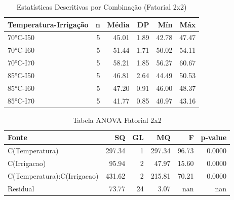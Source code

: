 \begin{table}[H]
\centering
\caption{Estatísticas Descritivas por Combinação (Fatorial 2x2)}
\label{tab:descritivas_fatorial}
\begin{tabular}{|l|r|r|r|r|r|}
\hline
\textbf{Temperatura-Irrigação} & \textbf{n} & \textbf{Média} & \textbf{DP} & \textbf{Mín} & \textbf{Máx} \\
\hline
70°C-I50 & 5 & 45.01 & 1.89 & 42.78 & 47.47 \\
70°C-I60 & 5 & 51.44 & 1.71 & 50.02 & 54.11 \\
70°C-I70 & 5 & 58.21 & 1.85 & 56.27 & 60.67 \\
85°C-I50 & 5 & 46.81 & 2.64 & 44.49 & 50.53 \\
85°C-I60 & 5 & 47.20 & 0.91 & 46.00 & 48.37 \\
85°C-I70 & 5 & 41.77 & 0.85 & 40.97 & 43.16 \\
\hline
\end{tabular}
\end{table}

\begin{table}[H]
\centering
\caption{Tabela ANOVA Fatorial 2x2}
\label{tab:anova_fatorial}
\begin{tabular}{|l|r|r|r|r|r|}
\hline
\textbf{Fonte} & \textbf{SQ} & \textbf{GL} & \textbf{MQ} & \textbf{F} & \textbf{p-value} \\
\hline
C(Temperatura) & 297.34 & 1 & 297.34 & 96.73 & 0.0000 \\
C(Irrigacao) & 95.94 & 2 & 47.97 & 15.60 & 0.0000 \\
C(Temperatura):C(Irrigacao) & 431.62 & 2 & 215.81 & 70.21 & 0.0000 \\
Residual & 73.77 & 24 & 3.07 & nan & nan \\
\hline
\end{tabular}
\end{table}
